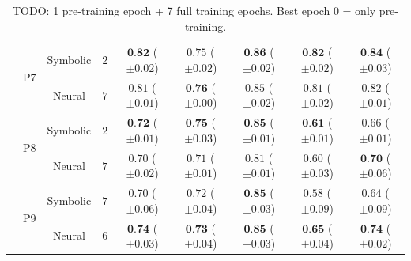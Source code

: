 \begin{table}[!t]
\begin{tabular}{ccccccccc}
		\cmidrule{2-9}
		& \multirow{2}{*}{P7} & Symbolic & $2$ & $\textbf{0.82} $ {\tiny ($\pm 0.02$)} & $0.75 $ {\tiny ($\pm 0.02$)} & $\textbf{0.86} $ {\tiny ($\pm 0.02$)} & $\textbf{0.82} $ {\tiny ($\pm 0.02$)} & $\textbf{0.84} $ {\tiny ($\pm 0.03$)}\\
		&  & Neural & $7$ & $0.81 $ {\tiny ($\pm 0.01$)} & $\textbf{0.76} $ {\tiny ($\pm 0.00$)} & $0.85 $ {\tiny ($\pm 0.02$)} & $0.81 $ {\tiny ($\pm 0.02$)} & $0.82 $ {\tiny ($\pm 0.01$)}\\
		\cmidrule{2-9}
		& \multirow{2}{*}{P8} & Symbolic & $2$ & $\textbf{0.72} $ {\tiny ($\pm 0.01$)} & $\textbf{0.75} $ {\tiny ($\pm 0.03$)} & $\textbf{0.85} $ {\tiny ($\pm 0.01$)} & $\textbf{0.61} $ {\tiny ($\pm 0.01$)} & $0.66 $ {\tiny ($\pm 0.01$)}\\
		&  & Neural & $7$ & $0.70 $ {\tiny ($\pm 0.02$)} & $0.71 $ {\tiny ($\pm 0.01$)} & $0.81 $ {\tiny ($\pm 0.01$)} & $0.60 $ {\tiny ($\pm 0.03$)} & $\textbf{0.70} $ {\tiny ($\pm 0.06$)}\\
		\cmidrule{2-9}
		& \multirow{2}{*}{P9} & Symbolic & $7$ & $0.70 $ {\tiny ($\pm 0.06$)} & $0.72 $ {\tiny ($\pm 0.04$)} & $\textbf{0.85} $ {\tiny ($\pm 0.03$)} & $0.58 $ {\tiny ($\pm 0.09$)} & $0.64 $ {\tiny ($\pm 0.09$)}\\
		&  & Neural & $6$ & $\textbf{0.74} $ {\tiny ($\pm 0.03$)} & $\textbf{0.73} $ {\tiny ($\pm 0.04$)} & $\textbf{0.85} $ {\tiny ($\pm 0.03$)} & $\textbf{0.65} $ {\tiny ($\pm 0.04$)} & $\textbf{0.74} $ {\tiny ($\pm 0.02$)}\\
		
		\bottomrule
	\end{tabular}
\caption{TODO: 1 pre-training epoch + 7 full training epochs. Best epoch 0 = only pre-training.}
\end{table}

\fi


